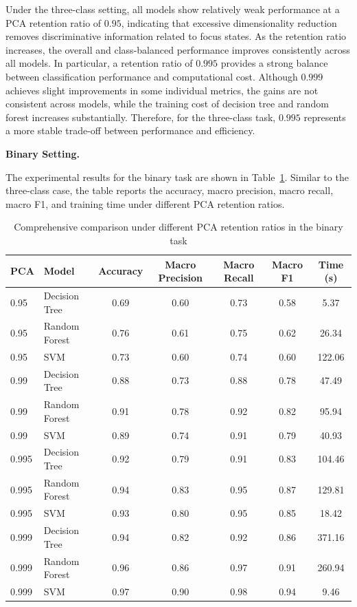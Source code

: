 \par Under the three-class setting, all models show relatively weak performance
at a PCA retention ratio of $0.95$, indicating that excessive dimensionality
reduction removes discriminative information related to focus states. As the
retention ratio increases, the overall and class-balanced performance improves
consistently across all models. In particular, a retention ratio of $0.995$
provides a strong balance between classification performance and computational
cost. Although $0.999$ achieves slight improvements in some individual metrics,
the gains are not consistent across models, while the training cost of decision
tree and random forest increases substantially. Therefore, for the three-class
task, $0.995$ represents a more stable trade-off between performance and
efficiency.

\par\medskip \noindent\textbf{Binary Setting.}
\par The experimental results for the binary task are shown in
Table~\ref{tab:pca-binary-pca}. Similar to the three-class case, the table
reports the accuracy, macro precision, macro recall, macro F1, and training
time under different PCA retention ratios.

\begin{table}[htbp]
    \centering
    \caption{Comprehensive comparison under different PCA retention ratios in the binary task}
    \label{tab:pca-binary-pca}
    \begin{tabular}{llccccc}
        \toprule
        PCA & Model & Accuracy & Macro Precision &
        Macro Recall & Macro F1 & Time (s) \\
        \midrule
        0.95  & Decision Tree & 0.69 & 0.60 & 0.73 & 0.58 & 5.37   \\
        0.95  & Random Forest & 0.76 & 0.61 & 0.75 & 0.62 & 26.34  \\
        0.95  & SVM           & 0.73 & 0.60 & 0.74 & 0.60 & 122.06 \\
        0.99  & Decision Tree & 0.88 & 0.73 & 0.88 & 0.78 & 47.49  \\
        0.99  & Random Forest & 0.91 & 0.78 & 0.92 & 0.82 & 95.94  \\
        0.99  & SVM           & 0.89 & 0.74 & 0.91 & 0.79 & 40.93  \\
        0.995 & Decision Tree & 0.92 & 0.79 & 0.91 & 0.83 & 104.46 \\
        0.995 & Random Forest & 0.94 & 0.83 & 0.95 & 0.87 & 129.81 \\
        0.995 & SVM           & 0.93 & 0.80 & 0.95 & 0.85 & 18.42  \\
        0.999 & Decision Tree & 0.94 & 0.82 & 0.92 & 0.86 & 371.16 \\
        0.999 & Random Forest & 0.96 & 0.86 & 0.97 & 0.91 & 260.94 \\
        0.999 & SVM           & 0.97 & 0.90 & 0.98 & 0.94 & 9.46   \\
        \bottomrule
    \end{tabular}
\end{table}

